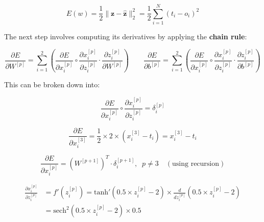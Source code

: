 \documentclass[12pt]{article}
\begin{document}
\begin{enumerate}[leftmargin=\labelsep]
          \begin{equation}\label{ex2-loss}
              E(w) = \frac{1}{2} \|\mathbf{z} - \hat{\mathbf{z}}\|^{2}_{2} = \frac{1}{2} \sum^{N}_{i = 1} \left(t_i - o_i\right)^2
          \end{equation}

          The next step involves computing its derivatives by applying the \textbf{chain rule}:

          \begin{equation}
            \frac{\partial E}{\partial W^{[p]}} = \sum_{i=1}^{2} \left(\frac{\partial E}{\partial x^{[p]}_i} \circ
              \frac{\partial x^{[p]}_i}{\partial z^{[p]}_i} \cdot \frac{\partial z^{[p]}_i}{\partial W^{[p]}} \right)
            \qquad
            \frac{\partial E}{\partial b^{[p]}} = \sum_{i=1}^{2} \left(\frac{\partial E}{\partial x^{[p]}_i} \circ
              \frac{\partial x^{[p]}_i}{\partial z^{[p]}_i} \cdot \frac{\partial z^{[p]}_i}{\partial b^{[p]}} \right)
          \end{equation}

          This can be broken down into:

          \vskip -0.2cm
          \begin{equation*}
              \frac{\partial E}{\partial x^{[p]}_i} \circ \frac{\partial x^{[p]}_i}{\partial z^{[p]}_i} = \delta^{[p]}_i
          \end{equation*}

          \begin{equation*}
              \frac{\partial E}{\partial x^{[3]}_i} = \frac{1}{2} \times 2 \times \left(x^{[3]}_i - t_i\right)
              = x^{[3]}_i - t_i
          \end{equation*}

          \begin{equation*}
              \frac{\partial E}{\partial x^{[p]}_i} = \left(W^{[p+1]}\right)^{T} \cdot \delta^{[p+1]}_i, \;\; p \neq 3 \quad (\text{using recursion})
          \end{equation*}

          \vskip -0.5cm
          \begin{align*}
              \frac{\partial x^{[p]}_i}{\partial z^{[p]}_i} & = f'\left(z^{[p]}_i\right) = \text{tanh}'\left(0.5 \times z^{[p]}_i - 2\right) \times
              \frac{d}{d z^{[p]}_i} \left(0.5 \times z^{[p]}_i - 2\right) \\
              & = \text{sech}^2\left(0.5 \times z^{[p]}_i - 2\right) \times 0.5
          \end{align*}


\end{enumerate}
\end{document}
